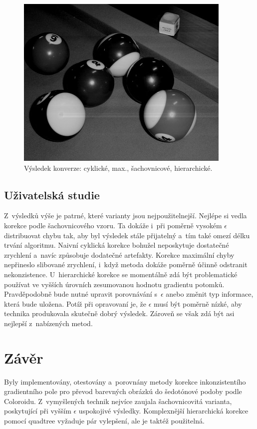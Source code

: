 \documentclass[11pt,a4paper,oneside]{article}
\begin{document}
\begin{figure}[!htbp]
		\includegraphics[scale=0.4]{fig/balls_hier.jpg}
		\caption{Výsledek konverze: cyklické, max.,
		         šachovnicové, hierarchické.}
		\label{fig:res_cyc}
	\end{figure}

	\subsection{Uživatelská studie}
	Z~výsledků výše je patrné, které varianty jsou nejpoužitelnejší.
	Nejlépe si vedla korekce podle šachovnicového vzoru. Ta dokáže i~při poměrně
	vysokém $\epsilon$ distribuovat chybu tak, aby byl výsledek stále přijatelný
	a~tím také omezí délku trvání algoritmu. Naivní cyklická korekce bohužel
	neposkytuje dostatečné zrychlení a~navíc způsobuje dodatečné artefakty. 
	Korekce maximální chyby nepřineslo slibované zrychlení, i~když metoda dokáže
	poměrně účinně odstranit nekonzistence. U~hierarchické korekce se momentálně
	zdá být problematické používat ve vyšších úrovních zesumovanou hodnotu gradientu
	potomků. Pravděpodobně bude nutné upravit porovnávání s~$\epsilon$ anebo změnit typ informace,
	která bude uložena. Potíž při opravovaní je, že $\epsilon$ musí být poměrně nízké,
	aby technika produkovala skutečně dobrý výsledek. Zároveň se však zdá být asi nejlepší
	z~nabízených metod.

	\section{Závěr}
	Byly implementovány, otestovány a~porovnány metody korekce inkonzistentího gradientního
	pole pro převod barevných obrázkú do šedotónové podoby podle Coloroidu. Z~vymyšlených
	technik nejvíce zaujala šachovnicovitá varianta, poskytující při vyšším $\epsilon$ uspokojivé
	výsledky. Komplexnější hierarchická korekce pomocí quadtree vyžaduje pár vylepšení,
	ale je taktéž použitelná.

	
	
\end{document}
